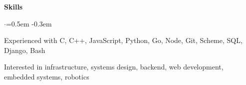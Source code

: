 \documentclass{resume} %
\begin{document}

\begin{rSection}{\textbf{Skills}}
  \vspace {0.3em} 
  \begin{list}{$\cdot$}{\leftmargin=0.5em}
    \itemsep -0.3em \vspace{-0.3em}
    \item Experienced with C, C++, JavaScript, Python, Go, Node, Git, Scheme, SQL, Django, Bash
    \item Interested in infrastructure, systems design, backend, web development, embedded systems, robotics
  \end{list}
  \vspace{0.3em}
\end{rSection}

\end{document}
